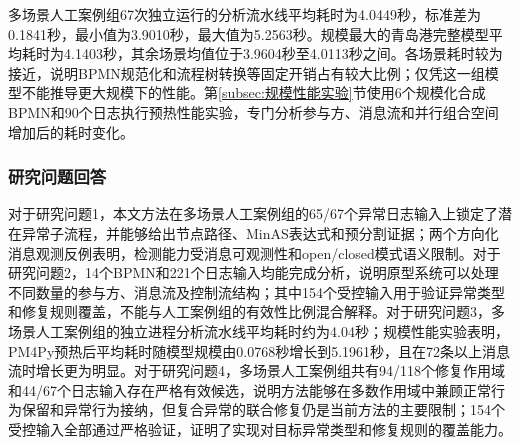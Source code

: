 多场景人工案例组67次独立运行的分析流水线平均耗时为4.0449秒，标准差为0.1841秒，最小值为3.9010秒，最大值为5.2563秒。规模最大的青岛港完整模型平均耗时为4.1403秒，其余场景均值位于3.9604秒至4.0113秒之间。各场景耗时较为接近，说明BPMN规范化和流程树转换等固定开销占有较大比例；仅凭这一组模型不能推导更大规模下的性能。第\ref{subsec:规模性能实验}节使用6个规模化合成BPMN和90个日志执行预热性能实验，专门分析参与方、消息流和并行组合空间增加后的耗时变化。

\subsubsection{研究问题回答}

对于研究问题1，本文方法在多场景人工案例组的65/67个异常日志输入上锁定了潜在异常子流程，并能够给出节点路径、MinAS表达式和预分割证据；两个方向化消息观测反例表明，检测能力受消息可观测性和open/closed模式语义限制。对于研究问题2，14个BPMN和221个日志输入均能完成分析，说明原型系统可以处理不同数量的参与方、消息流及控制流结构；其中154个受控输入用于验证异常类型和修复规则覆盖，不能与人工案例组的有效性比例混合解释。对于研究问题3，多场景人工案例组的独立进程分析流水线平均耗时约为4.04秒；规模性能实验表明，PM4Py预热后平均耗时随模型规模由0.0768秒增长到5.1961秒，且在72条以上消息流时增长更为明显。对于研究问题4，多场景人工案例组共有94/118个修复作用域和44/67个日志输入存在严格有效候选，说明方法能够在多数作用域中兼顾正常行为保留和异常行为接纳，但复合异常的联合修复仍是当前方法的主要限制；154个受控输入全部通过严格验证，证明了实现对目标异常类型和修复规则的覆盖能力。
